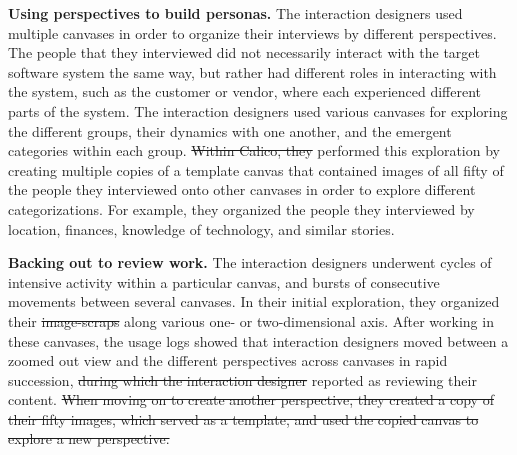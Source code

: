 \documentclass[12pt,fleqn]{ucithesis}
\providecommand{\DIFaddtex}[1]{{\protect\color{blue}\uwave{#1}}} %
\providecommand{\DIFdeltex}[1]{{\protect\color{red}\sout{#1}}}                      %
\providecommand{\DIFaddbegin}{} %
\providecommand{\DIFaddend}{} %
\providecommand{\DIFdelbegin}{} %
\providecommand{\DIFdelend}{} %
\providecommand{\DIFadd}[1]{\texorpdfstring{\DIFaddtex{#1}}{#1}} %
\providecommand{\DIFdel}[1]{\texorpdfstring{\DIFdeltex{#1}}{}} %
\begin{document}
\textbf{Using perspectives to build personas.} The interaction designers used multiple canvases in order to organize their interviews by different perspectives. The people that they interviewed did not necessarily interact with the target software system the same way, but rather had different roles in interacting with the system, such as the customer or vendor, where each experienced different parts of the system. The interaction designers used various canvases for exploring the different groups, their dynamics with one another, and the emergent categories within each group. \DIFdelbegin \DIFdel{Within Calico, they }\DIFdelend \DIFaddbegin \DIFadd{They }\DIFaddend performed this exploration by creating multiple copies of a template canvas that contained images of all fifty of the people they interviewed onto other canvases in order to explore different categorizations. For example, they organized the people they interviewed by location, finances, knowledge of technology, and similar stories. 

\textbf{Backing out to review work.} The interaction designers underwent cycles of intensive activity within a particular canvas, and bursts of consecutive movements between several canvases. In their initial exploration, they organized their \DIFdelbegin \DIFdel{image-scraps }\DIFdelend \DIFaddbegin \DIFadd{image scraps }\DIFaddend along various one- or two-dimensional axis. After working in these canvases, the usage logs showed that interaction designers moved between a zoomed out view and the different perspectives across canvases in rapid succession, \DIFdelbegin \DIFdel{during which the interaction designer }\DIFdelend \DIFaddbegin \DIFadd{which they }\DIFaddend reported as reviewing their content.
\DIFdelbegin \DIFdel{When moving on to create another perspective, they created a copy of their fifty images, which served as a template, and used the copied canvas to explore a new perspective.
}\DIFdelend 
\end{document}
